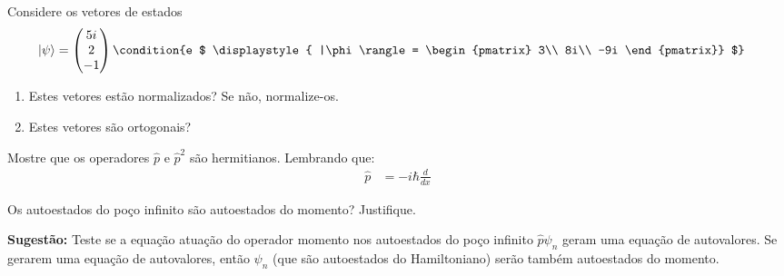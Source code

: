  \begin{prob}
	Considere os vetores de estados
	\begin{align} 
		|\psi\rangle &=
		\begin{pmatrix}
			5i\\
			2\\
			-1
		\end{pmatrix}\condition{e $
			\displaystyle{
				|\phi\rangle =
				  \begin{pmatrix}
						3\\
						8i\\
						-9i									 
				\end{pmatrix}}
		$} 
	\end{align}
	\begin{enumerate}[label=\alph *)]
		\item Estes vetores estão normalizados? Se não, normalize-os.
		\item Estes vetores são ortogonais?
	\end{enumerate}

	\begin{sol}

	\end{sol}		
 \end{prob}

	\begin{prob}
		Mostre que os operadores $\hat{p}$ e $\hat{p}^{2}$ são hermitianos. Lembrando que:
		\begin{align}
			\hat{p}&=-i \hbar \frac{d}{dx}
		\end{align}
	\end{prob}

	\begin{prob}
		Os autoestados do poço infinito são autoestados do momento? Justifique.
		\par\noindent\textbf{Sugestão:} Teste se a equação atuação do operador  momento  nos autoestados do poço infinito $\hat{p} \psi_{n}$ geram uma equação de autovalores. Se gerarem uma equação de autovalores, então $\psi_{n}$ (que são autoestados do Hamiltoniano) serão também  autoestados do momento.
	\end{prob}

